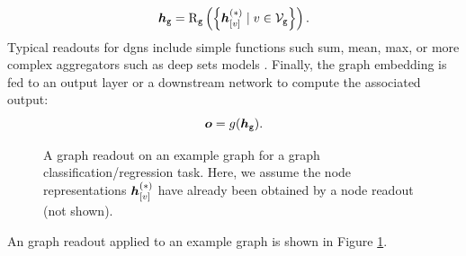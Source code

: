 $$\GraphRepr{g} = \GraphReadout{g}\Par{\Set{\StateVector{v}{*} \mid v \in \Nodes{g}}}.$$
Typical readouts for \glspl{dgn} include simple functions such sum, mean, max, or more complex aggregators such as deep sets models \citep{zaheer2017deepsets}. Finally, the graph embedding is fed to an output layer or a downstream network to compute the associated output:
$$\Vector{o} = g(\GraphRepr{g}).$$
\begin{figure}[h!]
    \centering
    \resizebox{.6\textwidth}{!}{}
    \caption{A graph readout on an example graph for a graph classification/regression task. Here, we assume the node representations $\StateVector{v}{*}$ have already been obtained by a node readout (not shown).}
    \label{fig:graph-readout}
\end{figure}
An graph readout applied to an example graph is shown in Figure \ref{fig:graph-readout}.

